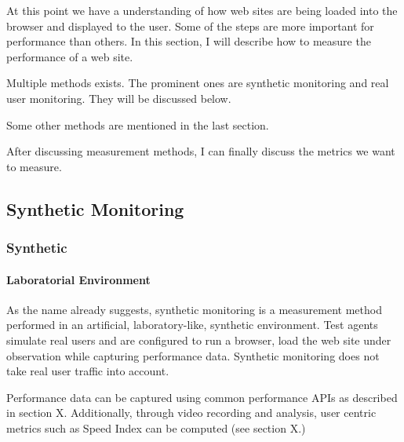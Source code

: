
At this point we have a understanding of how web sites are being loaded into the browser and displayed to the user.
Some of the steps are more important for performance than others.
In this section, I will describe how to measure the performance of a web site.


Multiple methods exists.
The prominent ones are synthetic monitoring and real user monitoring.
They will be discussed below.

Some other methods are mentioned in the last section.

After discussing measurement methods, I can finally discuss the metrics we want to measure.










\subsection{Synthetic Monitoring}


\subsubsection{Synthetic}

\paragraph{Laboratorial Environment}

As the name already suggests, synthetic monitoring is a measurement method performed in an artificial, laboratory-like, synthetic environment.
Test agents simulate real users and are configured to run a browser, load the web site under observation while capturing performance data.
Synthetic monitoring does not take real user traffic into account. %

Performance data can be captured using common performance APIs as described in section X.
Additionally, through video recording and analysis,  user centric metrics such as Speed Index can be computed (see section X.) %


